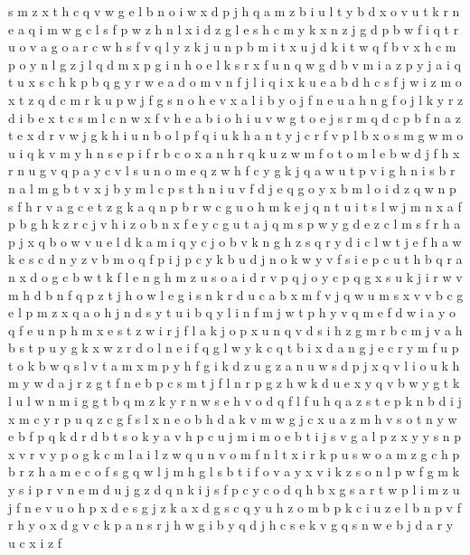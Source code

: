 \documentclass{article}
\begin{document}
s m z x t h c q v w g e l b n o i
w x d p j h q a m z b i u l t
y b d x o v u t k r n e a q i m w g c l s f p
w z h n l x i
d z g
l e s h c m y k x n z j g d p b w f i q t r u o v a
g o a r c w h s f v q l y z k j u n p b m i t x
u j d k i t w q f b v x h c m p o y n l g z
j l q d m x p g i n
h o e l k s r x f u n q w g d b v m i a z p y j
a i q
t u
x s c h k p b q g y r w e a d o m v n f j l i
q i x k u e a b d
h c s f j w i z m o x
t z q d c m r k u p w j f g s n o h e v x a l i b y
o j f n e u
a h n g f o j l k y r z d i b e x t c s
m
l c n w x f v h e a b i o
h i u v w g t o e j s r m q d c p b f n a z
t e x d r v w j g k h i u n b o l p f q
i u k h a n t y j c r f v p l b x o s m g w
m o u i
q k v m y h n s e p i f r b c o x a
n h r q k u z w m f o
t o m l e b w d j f h x r n u g v q p a y c
v l s u n o m e q z w h f c y g k j
q a w u t p v i g h n
i s b
r n a l m g b t v x j
b y m l c p s t h n i u v f d j e q g o
y x b m l o i d z q w n p s f h r v a g c e t
z g k a q n
p b r w c g u o h m k e j q n t
u i t s l w j m n x a f p b g h k z r c
j
v h i z o b n x f e y c g u t a j q m s p w
y g d e z c l m s f r h a p j x q b o w v u
e l d k a m i q y c j o
b v k n g h z s q r y d i c l w t j e f
h a w k e s c d n y z v b m o q f p i j
p c y k b u d j n o
k w y v f s i e p c u t h b q r a n x d o g
c b w t k f l e n g h m z u s o a i d r v p q j
o y c p q g x s u k j i r w v m h d b n f
q p z t j h o w l e g i s n k r d u c a b x m f v
j q w u m s x v
v b c g e l p m z x q a o h j n d s y t u i
b
q y l i n f m j w t p
h y v q m e f
d w i a y o q f e u n
p h m x
e s t z w i r j f
l a k j o p x u n q v d s i h z g m r b
c m j v a h b s t p u y g k x w z r d o l n e i f q
g l w y k c q t b i
x d a n g j e c r y m f u p t o k b w q s l
v t a m
x m p y h f g i k d z u
g z a n u w s d p j
x q v l i o u k h m y w d a j r z g t f n e b p
c s m t j f l n r p g z h w k d u e x y q v
b w y g t k l u
l w n m i g
g t
b q m z k y r n w s e h v
o d q f
l f u h q a z s t e p k n b d i j x m c
y r p u q z c g f s l x n e o b h d a k v m w
g j c x u a z m h v s o t n y w e b f p q k d r
d b t s o k y a v h p c u j m i
m o e b t i j s v g a l p z x y
y s n p x v r
v y p o g k c m l
a i l z w q u n v o m
f n l t x i r k p u s w o a m z g c h
p b r z h a m e c o f s g q w l j
m h g l s b t i f o v a
y x v i k z s o n l p w f g m
k y s i p r v n e m d u j g z
d q n k i j s f p c
y c o d q h b x g s a r t w p l i m z u j f n e v
u o h p x d e s g j z k
a x d g s c q y u h z o m b p
k c i u z e l b n p v f r h y o x d
g v c k p a n s r j h
w g i b y q d j h c s e k v
g q s n w e b j d a r y u c x i z f
\end{document}
